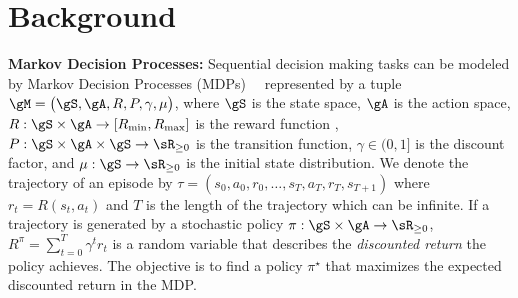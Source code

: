 \section{Background}
\textbf{Markov Decision Processes:}
Sequential decision making tasks can be modeled by
Markov Decision Processes (MDPs)~\citep{sutton2018reinforcement}~%
represented by a tuple $\gM = \big( \gS, \gA, R, P, \gamma, \mu \big)$, where $\gS$ is the state space, $\gA$ is the action space, $R: \gS \times \gA \rightarrow [R_{\min}, R_{\max} ]$ is the reward function
, $P: \gS \times \gA \times \gS \rightarrow \sR_{\geq 0}$ is the transition function, $\gamma \in (0, 1]$ is the discount factor, and $\mu: \gS \rightarrow \sR_{\geq 0}$ is the initial state distribution. We denote the trajectory of an episode by $\tau = (s_0, a_0, r_0, \dots, s_T, a_T, r_T, s_{T+1})$ where $r_t = R(s_t, a_t)$ and $T$ is the length of the trajectory which can be infinite. 
%
If a trajectory is generated by a stochastic policy $\pi: \gS \times \gA \rightarrow \sR_{\geq 0}$, $R^\pi = \sum_{t=0}^T \gamma^t r_t$ is a random variable that describes the \textit{discounted return} the policy achieves. The objective is to find a policy $\pi^\star$ that maximizes the expected discounted return in the MDP.

